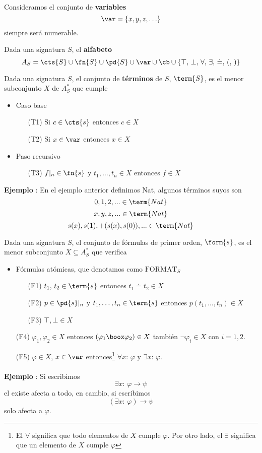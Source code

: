 \paragraph{}
Consideramos el conjunto de \textbf{variables}
\[ \var = \{x,y,z, \ldots \} \]
siempre será numerable. 
\begin{definition}
Dada una signatura $S$, el \textbf{alfabeto} 
\[ A_S =\cts{S} \cup \fn{S} \cup \pd{S} \cup \var \cup \cb \cup \{ \top,\, \bot,\, \forall,\, \exists,\, \doteq, \, (, \, )\} \]
\end{definition}
\begin{definition}
Dada una signatura $S$, el conjunto de \textbf{términos} de $S$, $\term{S}$, es el menor subconjunto $X$ de $A^*_S$ que cumple 
\begin{itemize}
	\item Caso base 
	\begin{itemize}
		\item[(T1)] Si $c \in \cts{s}$ entonces $c \in X$
		\item[(T2)] Si $x \in \var$ entonces $x \in X$
	\end{itemize}
	\item Paso recursivo
	\begin{itemize}
		\item[(T3)] $f\vert_{n} \in \fn{s}$ y $t_1, \ldots, t_n \in X$ entonces $f \in X$
	\end{itemize}
\end{itemize}
\end{definition}
\addtocounter{ej}{1} %
\textbf{Ejemplo }: En el ejemplo anterior definimos Nat, algunos términos suyos son 
\[ 0, 1, 2,... \in \term{Nat} \] 
\[ x, y, z,... \in \term{Nat} \]
\[ s(x), s(1), +(s(x),s(0)),... \in \term{Nat} \]
\begin{definition}
Dada una signatura $S$, el conjunto de fórmulas de primer orden, $\form{s}$, es el menor subconjunto $X \subseteq A^*_S$ que verifica
\begin{itemize}
	\item Fórmulas atómicas, que denotamos como $\mbox{FORMAT}_{S}$
	\begin{itemize}
		\item[(F1)] $t_1, \, t_2 \in \term{s}$ entonces $t_1 \doteq t_2 \in X$
		\item[(F2)] $p \in \pd{s}\vert_{n}$ y $t_1, \ldots, t_n \in \term{s}$ entonces $p(t_1, \ldots, t_n) \in X$
		\item[(F3)]$\top, \bot \in X$
	\end{itemize}
	\item[(F4)] $\varphi_1, \varphi_2 \in X$ entonces $(\varphi_1 \boox \varphi_2) \in X$ también $\neg \varphi_i \in X$ con $i=1,2$.
	\item[(F5)] $\varphi \in X$, $x \in \var$ entonces\footnote{El $\forall$ significa que todo elementos de $X$ cumple $\varphi$. Por otro lado, el $\exists$ significa que un elemento de $X$ cumple $\varphi$} $\forall x: \, \varphi$ y $\exists x: \, \varphi$.
\end{itemize}
\end{definition}
\paragraph{}
\addtocounter{ej}{1} %
\textbf{Ejemplo }: Si escribimos 
\[  \exists x: \, \varphi \rightarrow \psi  \]
el existe afecta a todo, en cambio, si escribimos 
\[  (\exists x: \, \varphi) \rightarrow \psi  \]
solo afecta a $\varphi$.
